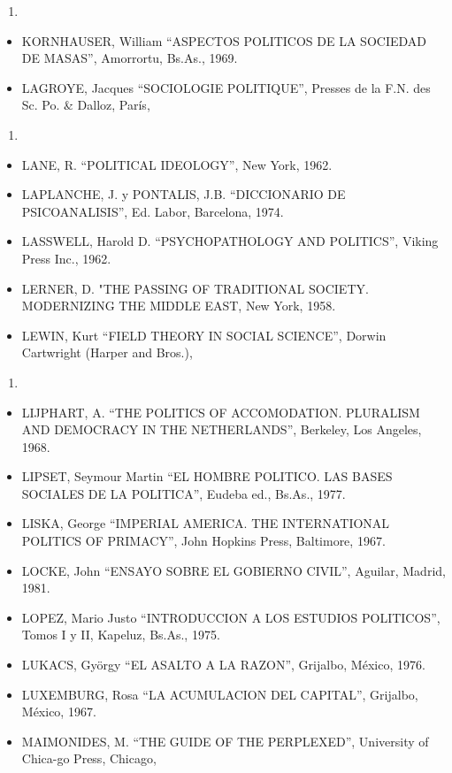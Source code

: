 \documentclass[
]{book}
\providecommand{\tightlist}{%
  \setlength{\itemsep}{0pt}\setlength{\parskip}{0pt}}
\begin{document}
\begin{enumerate}
\def\labelenumi{\arabic{enumi}.}
\setcounter{enumi}{1968}
\tightlist
\item
\end{enumerate}

\begin{itemize}
\tightlist
\item
  KORNHAUSER, William ``ASPECTOS POLITICOS DE LA SOCIEDAD DE MASAS'', Amorrortu,
  Bs.As., 1969.
\item
  LAGROYE, Jacques ``SOCIOLOGIE POLITIQUE'', Presses de la F.N. des Sc. Po. \& Dalloz, París,
\end{itemize}

\begin{enumerate}
\def\labelenumi{\arabic{enumi}.}
\setcounter{enumi}{1990}
\tightlist
\item
\end{enumerate}

\begin{itemize}
\tightlist
\item
  LANE, R. ``POLITICAL IDEOLOGY'', New York, 1962.
\item
  LAPLANCHE, J. y PONTALIS, J.B. ``DICCIONARIO DE PSICOANALISIS'', Ed. Labor,
  Barcelona, 1974.
\item
  LASSWELL, Harold D. ``PSYCHOPATHOLOGY AND POLITICS'', Viking Press Inc., 1962.
\item
  LERNER, D. "THE PASSING OF TRADITIONAL SOCIETY. MODERNIZING THE MIDDLE
  EAST, New York, 1958.
\item
  LEWIN, Kurt ``FIELD THEORY IN SOCIAL SCIENCE'', Dorwin Cartwright (Harper and Bros.),
\end{itemize}

\begin{enumerate}
\def\labelenumi{\arabic{enumi}.}
\setcounter{enumi}{1950}
\tightlist
\item
\end{enumerate}

\begin{itemize}
\tightlist
\item
  LIJPHART, A. ``THE POLITICS OF ACCOMODATION. PLURALISM AND DEMOCRACY IN
  THE NETHERLANDS'', Berkeley, Los Angeles, 1968.
\item
  LIPSET, Seymour Martin ``EL HOMBRE POLITICO. LAS BASES SOCIALES DE LA POLITICA'',
  Eudeba ed., Bs.As., 1977.
\item
  LISKA, George ``IMPERIAL AMERICA. THE INTERNATIONAL POLITICS OF PRIMACY'',
  John Hopkins Press, Baltimore, 1967.
\item
  LOCKE, John ``ENSAYO SOBRE EL GOBIERNO CIVIL'', Aguilar, Madrid, 1981.
\item
  LOPEZ, Mario Justo ``INTRODUCCION A LOS ESTUDIOS POLITICOS'', Tomos I y II, Kapeluz,
  Bs.As., 1975.
\item
  LUKACS, György ``EL ASALTO A LA RAZON'', Grijalbo, México, 1976.
\item
  LUXEMBURG, Rosa ``LA ACUMULACION DEL CAPITAL'', Grijalbo, México, 1967.
\item
  MAIMONIDES, M. ``THE GUIDE OF THE PERPLEXED'', University of Chica-go Press, Chicago,
\end{itemize}
\end{document}
